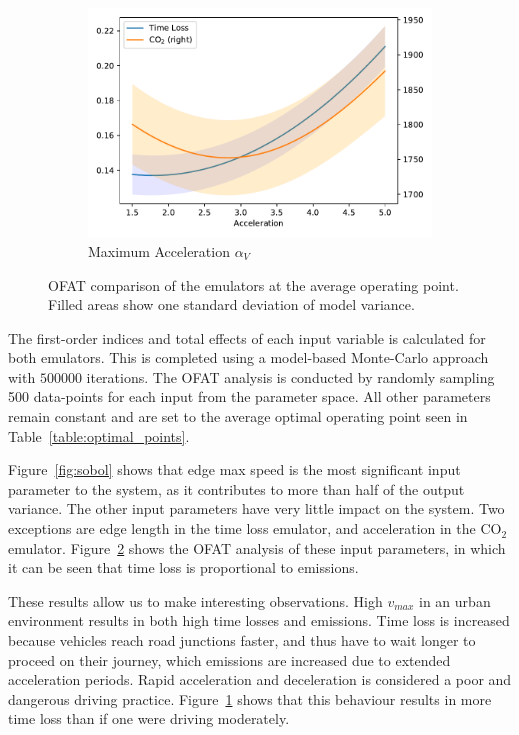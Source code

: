 \documentclass{article}
\begin{document}
\begin{figure}[t!]
\begin{subfigure}[b]{0.49\textwidth}
        \includegraphics[width=\textwidth]{images/acceleration.pdf}
        \caption{Maximum Acceleration $\alpha_V$}
        \label{fig:acceleration}
    \end{subfigure}
    \caption{OFAT comparison of the emulators at the average operating point. Filled areas show one standard deviation of model variance.}
    \label{fig:ofat}
\end{figure}

The first-order indices and total effects of each input variable is calculated for both emulators. This is completed using a model-based Monte-Carlo approach with $500000$ iterations. The OFAT analysis is conducted by randomly sampling 500 data-points for each input from the parameter space. All other parameters remain constant and are set to the average optimal operating point seen in Table~\ref{table:optimal_points}.

Figure~\ref{fig:sobol} shows that edge max speed is the most significant input parameter to the system, as it contributes to more than half of the output variance. The other input parameters have very little impact on the system. Two exceptions are edge length in the time loss emulator, and acceleration in the CO$_2$ emulator. Figure~\ref{fig:ofat} shows the OFAT analysis of these input parameters, in which it can be seen that time loss is proportional to emissions.

These results allow us to make interesting observations. High $v_{max}$ in an urban environment results in both high time losses and emissions. Time loss is increased because vehicles reach road junctions faster, and thus have to wait longer to proceed on their journey, which emissions are increased due to extended acceleration periods. Rapid acceleration and deceleration is considered a poor and dangerous driving practice. Figure~\ref{fig:acceleration} shows that this behaviour results in more time loss than if one were driving moderately. 
\end{document}
